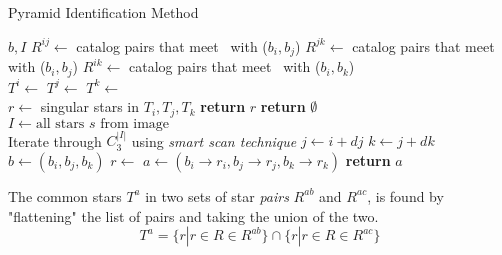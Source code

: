 \begin{algorithm}
    \caption{Pyramid Identification Method} \label{algorithm:pyramidIdentification}
    \begin{algorithmic}[1]
         {$b, I$}
        \State $R^{ij} \gets$ catalog pairs that meet~ with ($b_i, b_j$)
        \State $R^{jk} \gets$ catalog pairs that meet~ with ($b_i, b_j$)
        \State $R^{ik} \gets$ catalog pairs that meet~ with ($b_i, b_k$)
        \\
        \State $T^i \gets $ 
        \State $T^j \gets $ 
        \State $T^k \gets $ 
        \\
        \State $r \gets $ singular stars in $T_i, T_j, T_k$
        \State \textbf{return} $r$
        \EndIf
        \EndIf
        \State \textbf{return} $\emptyset$
        \EndFunction
        \\
        \State $I \gets \text{all stars } s \text{ from image}$
        \\
        \LineComment Iterate through $C^{|I|}_3$ using \textit{smart scan technique}
        \State $j \gets i + dj$
        \State $k \gets j + dk$
        \\
        \State $b \gets (b_i, b_j, b_k)$
        \State $r \gets$ 
        \State $a \gets (b_i \rightarrow r_i, b_j \rightarrow r_j, b_k \rightarrow r_k)$
        \State \textbf{return} $a$
        \EndIf
        \EndFor
        \EndFor
        \EndFor
        \EndProcedure
    \end{algorithmic}
\end{algorithm}

The common stars $T^a$ in two sets of star \textit{pairs} $R^{ab}$ and $R^{ac}$, is found by "flattening" the list of
pairs and taking the union of the two.
\begin{equation}
    \label{eq:commonStarsPyramid}
    T^a = \{ r | r \in R \in R^{ab} \} \cap \{ r | r \in R \in R^{ac} \}
\end{equation}

